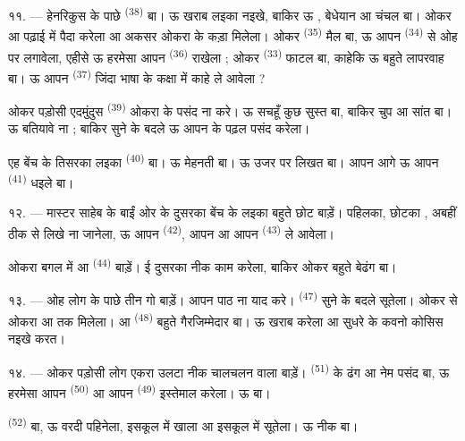 \VUsaut{4.2mm}
\VUsaut{3.2mm}

११. --- हेनरिकुस के पाछे  \textsuperscript{(38)} बा। ऊ
खराब लइका नइखे, बाकिर ऊ , बेधेयान आ चंचल बा। ओकर
 आ  पढ़ाई में  पैदा करेला आ
अकसर ओकरा के कड़ा  मिलेला। ओकर 
\textsuperscript{(35)} मैल बा, ऊ आपन  \textsuperscript{(34)}
से ओह पर  लगावेला, एहीसे ऊ हरमेसा आपन
 \textsuperscript{(36)} राखेला ; ओकर 
\textsuperscript{(33)} फाटल बा, काहेकि ऊ बहुते लापरवाह बा। ऊ आपन
 \textsuperscript{(37)} जिंदा भाषा के कक्षा में
काहे ले आवेला ?

ओकर पड़ोसी एदमुंदुस \textsuperscript{(39)} ओकरा के पसंद ना करे। ऊ सचहूँ
कुछ सुस्त बा, बाकिर चुप आ सांत बा। ऊ बतियावे ना ; बाकिर सुने के बदले ऊ
आपन  के  पढ़ल पसंद करेला।

एह बेंच के तिसरका लइका  \textsuperscript{(40)} बा। ऊ
मेहनती बा। ऊ उजर  पर लिखत बा। आपन आगे ऊ आपन
 \textsuperscript{(41)} धइले बा।

१२. --- मास्टर साहेब के बाईं ओर के दुसरका बेंच के लइका बहुते छोट बाड़ें।
पहिलका, छोटका , अबहीं ठीक से लिखे ना जानेला, ऊ आपन
 \textsuperscript{(42)}, आपन  आ आपन
 \textsuperscript{(43)} ले आवेला।

ओकरा बगल में  आ 
\textsuperscript{(44)} बाड़ें। ई दुसरका नीक काम करेला, बाकिर ओकर
 बहुते बेढंग बा।

१३. --- ओह लोग के पाछे तीन गो  बाड़ें। 
आपन पाठ ना याद करे।  \textsuperscript{(47)} सुने के बदले
सूतेला। ओकर  से ओकरा  आ  तक
मिलेला। आ  \textsuperscript{(48)} बहुते गैरजिम्मेदार
बा। ऊ खराब  करेला आ सुधरे के कवनो कोसिस नइखे करत।

१४. --- ओकर पड़ोसी लोग एकरा उलटा नीक चालचलन वाला बाड़ें।
 \textsuperscript{(51)} के ढंग आ नेम पसंद बा, ऊ हरमेसा
आपन  \textsuperscript{(50)} आ आपन 
\textsuperscript{(49)} इस्तेमाल करेला। ऊ  बा।

 \textsuperscript{(52)}  बा,
ऊ वरदी पहिनेला, इसकूल में खाला आ इसकूल में सूतेला। ऊ नीक 
बा।

